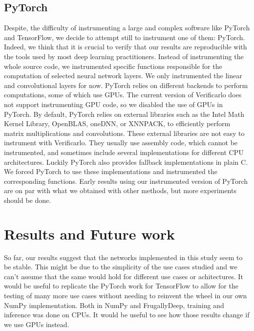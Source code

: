 \documentclass[a4paper,12pt]{article}
\begin{document}
\subsection{PyTorch}

Despite, the difficulty of instrumenting a large and complex software like
PyTorch and TensorFlow, we decide to attempt still to instrument one of them:
PyTorch. Indeed, we think that it is crucial to verify that our results are
reproducible with the tools used by most deep learning practitioners. Instead of
instrumenting the whole source code, we instrumented specific functions
responsible for the computation of selected neural network layers. We only
instrumented the linear and convolutional layers for now. PyTorch relies on
different backends to perform computations, some of which use GPUs. The current
version of Verificarlo does not support instrumenting GPU code, so we disabled
the use of GPUs in PyTorch. By default, PyTorch relies on external libraries such
as the Intel Math Kernel Library, OpenBLAS, oneDNN, or XNNPACK, to efficiently
perform matrix multiplications and convolutions. These external libraries are not
easy to instrument with Verificarlo. They usually use assembly code, which cannot be
instrumented, and sometimes include several implementations for different CPU
architectures. Luckily PyTorch also provides fallback implementations in plain C. We
forced PyTorch to use these implementations and instrumented the corresponding
functions. Early results using our instrumented version of PyTorch are on par with
what we obtained with other methods, but more experiments should be done.

\section{Results and Future work}
So far, our results suggest that the networks implemented in this study seem to
be stable. This might be due to the simplicity of the use cases studied and we
can't assume that the same would hold for different use cases or achitectures.
It would be useful to replicate the PyTorch work for TensorFlow to allow for the
testing of many more use cases without needing to reinvent the wheel in our own
NumPy implementation. Both in NumPy and FrugallyDeep, training and inference was
done on CPUs. It would be useful to see how those results change if we use GPUs
instead.
\end{document}
